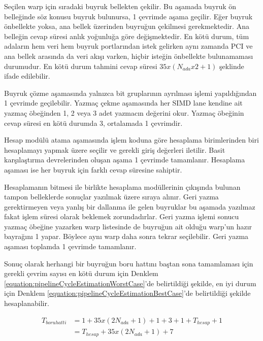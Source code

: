 Seçilen warp için sıradaki buyruk bellekten çekilir. Bu aşamada buyruk ön belleğinde söz konusu buyruk bulunursa, 1 çevrimde aşama geçilir. Eğer buyruk önbellekte yoksa, ana bellek üzerinden buyruğun çekilmesi gerekmektedir. Ana belleğin cevap süresi anlık yoğunluğa göre değişmektedir. En kötü durum, tüm adaların hem veri hem buyruk portlarından istek gelirken aynı zamanda PCI ve ana bellek arasında da veri akışı varken, hiçbir isteğin önbellekte bulunamaması durumudur. En kötü durum tahmini cevap süresi $35 x ( N_{ada} x 2 + 1 )$ şeklinde ifade edilebilir. \par

Buyruk çözme aşamasında yalnızca bit gruplarının ayrılması işlemi yapıldığından 1 çevrimde geçilebilir. Yazmaç çekme aşamasında her SIMD lane kendine ait yazmaç öbeğinden 1, 2 veya 3 adet yazmacın değerini okur. Yazmaç öbeğinin cevap süresi en kötü durumda 3, ortalamada 1 çevrimdir.\par
Hesap modülü atama aşamasında işlem koduna göre hesaplama birimlerinden biri hesaplamayı yapmak üzere seçilir ve gerekli giriş değerleri iletilir. Basit karşılaştırma devrelerinden oluşan aşama 1 çevrimde tamamlanır. Hesaplama aşaması ise her buyruk için farklı cevap süresine sahiptir. \par
Hesaplamanın bitmesi ile birlikte hesaplama modüllerinin çıkışında bulunan tampon belleklerde sonuçlar yazılmak üzere sıraya alınır. Geri yazma gerektirmeyen veya yanlış bir dallanma ile gelen buyruklar bu aşamada yazılmaz fakat işlem süresi olarak beklemek zorundadırlar. Geri yazma işlemi sonucu yazmaç öbeğine yazarken warp listesinde de buyruğun ait olduğu warp'un hazır bayrağını 1 yapar. Böylece aynı warp daha sonra tekrar seçilebilir. Geri yazma aşaması toplamda 1 çevrimde tamamlanır.\par

Sonuç olarak herhangi bir buyruğun boru hattını baştan sona tamamlaması için gerekli çevrim sayısı en kötü durum için Denklem \ref{equation:pipelineCycleEstimationWorstCase}'de belirtildiği şekilde, en iyi durum için Denklem \ref{equation:pipelineCycleEstimationBestCase}'de belirtildiği şekilde hesaplanabilir.\par

\begin{align} \label{equation:pipelineCycleEstimationWorstCase}
	T_{boru hatti} 	&= 1 + 35x(2N_{ada} + 1) + 1 + 3 + 1 + T_{hesap} + 1 \\
									&= T_{hesap} + 35 x (2N_{ada}+1) + 7
\end{align}

